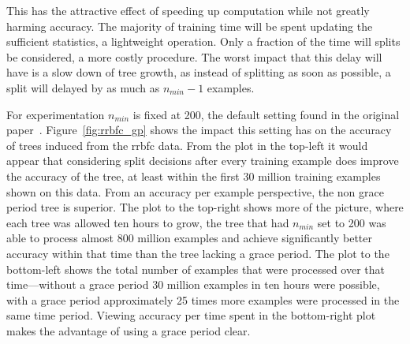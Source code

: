This has the attractive effect of speeding up computation while not greatly harming accuracy. The majority of training time will be spent updating the sufficient statistics, a lightweight operation. Only a fraction of the time will splits be considered, a more costly procedure. The worst impact that this delay will have is a slow down of tree growth, as instead of splitting as soon as possible, a split will delayed by as much as $n_{min}-1$ examples.

For experimentation $n_{min}$ is fixed at 200, the default setting found in the original paper~\cite{vfdt}. Figure~\ref{fig:rrbfc_gp} shows the impact this setting has on the accuracy of trees induced from the {\sc rrbfc} data. From the plot in the top-left it would appear that considering split decisions after every training example does improve the accuracy of the tree, at least within the first 30 million training examples shown on this data. From an accuracy per example perspective, the non grace period tree is superior. The plot to the top-right shows more of the picture, where each tree was allowed ten hours to grow, the tree that had $n_{min}$ set to 200 was able to process almost 800 million examples and achieve significantly better accuracy within that time than the tree lacking a grace period. The plot to the bottom-left shows the total number of examples that were processed over that time---without a grace period 30 million examples in ten hours were possible, with a grace period approximately 25 times more examples were processed in the same time period. Viewing accuracy per time spent in the bottom-right plot makes the advantage of using a grace period clear.

